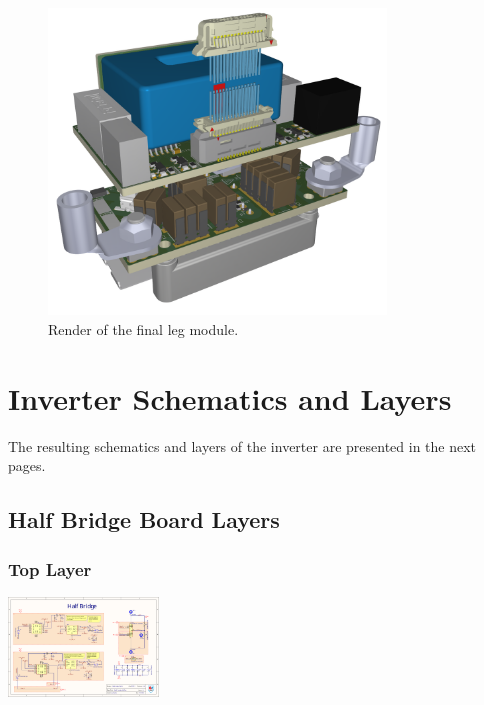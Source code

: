 \begin{figure}[H]
	\centering
	\includegraphics[width=0.8\textwidth]{Figures/Assembly.png}
	\caption{Render of the final leg module.}
	\label{fig:inverter_leg_render}
\end{figure}

\section{Inverter Schematics and Layers}

The resulting schematics and layers of the inverter are presented in the next pages.

\def\excerpt{\subsection{Half Bridge Board Schematic}\label{section:half_bridge_files}}

\def\excerpt{\subsection{Half Bridge Board Layers}
From top to bottom: Top Layer, Inner Layer 1, Inner Layer 2, Bottom Layer.}
% 
\subsection{Half Bridge Board Layers}
\subsubsection{Top Layer}
\begin{center}
	\includegraphics[page=2,width=0.3\textwidth,angle=90,origin=c]{./Appendix/Job3.pdf}
\end{center}
